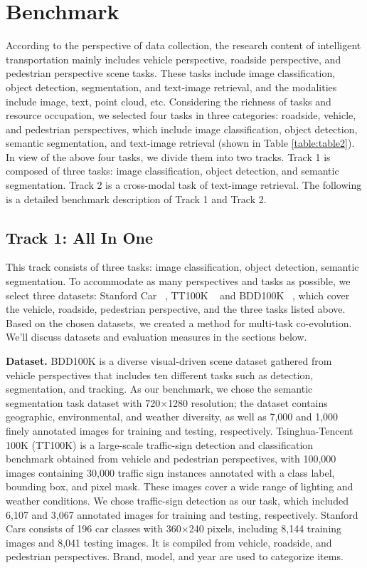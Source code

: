 \documentclass[10pt,twocolumn,letterpaper]{article}
\begin{document}
\section{Benchmark}
According to the perspective of data collection, the research content of intelligent transportation mainly includes vehicle perspective, roadside perspective, and pedestrian perspective scene tasks. These tasks include image classification, object detection, segmentation, and text-image retrieval, and the modalities include image, text, point cloud, etc. Considering the richness of tasks and resource occupation, we selected four tasks in three categories: roadside, vehicle, and pedestrian perspectives, which include image classification, object detection, semantic segmentation, and text-image retrieval (shown in Table \ref{table:table2}). In view of the above four tasks, we divide them into two tracks. Track 1 is composed of three tasks: image classification, object detection, and semantic segmentation. Track 2 is a cross-modal task of text-image retrieval. The following is a detailed benchmark description of Track 1 and Track 2.



\subsection{Track 1: All In One}
This track consists of three tasks: image classification, object detection, semantic segmentation. To accommodate as many perspectives and tasks as possible, we select three datasets: Stanford Car ~\cite{KrauseStarkDengFei-Fei_3DRR2013}, TT100K ~\cite{tt100k} and BDD100K ~\cite{Yu2018BDD100KAD}, which cover the vehicle, roadside, pedestrian perspective, and the three tasks listed above. Based on the chosen datasets, we created a method for multi-task co-evolution. We'll discuss datasets and evaluation measures in the sections below.

\textbf{Dataset.} 
BDD100K is a diverse visual-driven scene dataset gathered from vehicle perspectives that includes ten different tasks such as detection, segmentation, and tracking. As our benchmark, we chose the semantic segmentation task dataset with 720$\times$1280 resolution; the dataset contains geographic, environmental, and weather diversity, as well as 7,000 and 1,000 finely annotated images for training and testing, respectively.
Tsinghua-Tencent 100K (TT100K) is a large-scale traffic-sign detection and classification benchmark obtained from vehicle and pedestrian perspectives, with 100,000 images containing 30,000 traffic sign instances annotated with a class label, bounding box, and pixel mask. These images cover a wide range of lighting and weather conditions. We chose traffic-sign detection as our task, which included 6,107 and 3,067 annotated images for training and testing, respectively. Stanford Cars consists of 196 car classes with 360$\times$240 pixels, including 8,144 training images and 8,041 testing images. It is compiled from vehicle, roadside, and pedestrian perspectives. Brand, model, and year are used to categorize items.
\end{document}
